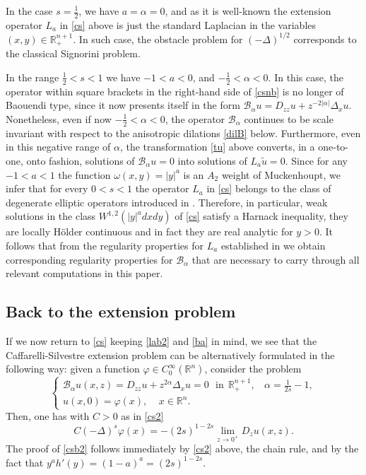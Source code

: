\documentclass[11pt]{amsart}
\theoremstyle{plain}
\numberwithin{equation}{section}
\begin{document}
In the case $s = \frac 12$, we have $a = \alpha = 0$, and as it is well-known the extension operator $L_a$ in \eqref{cs} above is just the standard Laplacian in the variables $(x,y)\in {\mathbb R}^{n+1}_+$. In such case, the obstacle problem for $(-\Delta)^{1/2}$ corresponds to the classical Signorini problem.

In the range $\frac 12 < s < 1$ we have $-1<a<0$, and $-\frac 12 < \alpha <0$. In this case, the operator within square brackets in the right-hand side of \eqref{csnb} is no longer of Baouendi type, since it now presents itself in the form ${\mathcal{B}_\alpha} u = D_{zz} u + z^{-2|\alpha|} \Delta_x u$. Nonetheless, even if now $-\frac 12 < \alpha <0$, the operator ${\mathcal{B}_\alpha}$ continues to be scale invariant with respect to the anisotropic dilations \eqref{dilB} below. Furthermore, even in this negative range of $\alpha$, the transformation \eqref{tu} above converts, in a one-to-one, onto fashion, solutions of  ${\mathcal{B}_\alpha} u = 0$ into solutions of $L_a\tilde u  = 0$.  Since for any $-1<a<1$ the function $\omega(x,y) = |y|^a$  is an $A_2$ weight of Muckenhoupt, we infer that for every $0<s<1$ the operator $L_a$ in \eqref{cs} belongs to the class of degenerate elliptic operators introduced in \cite{FKS}. Therefore, in particular, weak solutions in the class $W^{1,2}(|y|^a dx dy)$ of \eqref{cs} satisfy a Harnack inequality, they are locally H\"older continuous and in fact they are real analytic for $y>0$. It follows that from the regularity properties for $L_a$ established in \cite{CSS} we obtain corresponding regularity properties for ${\mathcal{B}_\alpha}$ that are necessary to carry through all relevant computations in this paper.

\subsection{Back to the extension problem}\label{S:bext} If we now return to \eqref{cs} keeping \eqref{lab2} and \eqref{ba} in mind, we see that the Caffarelli-Silvestre extension problem can be alternatively formulated in the following way: given a function ${\varphi}\in C^\infty_0({\mathbb R^n})$, consider the problem
\begin{equation}\label{csb}
\begin{cases}
{\mathcal{B}_\alpha} u(x,z) = D_{zz} u + z^{2\alpha} \Delta_x u = 0\ \ \ \text{in}\ \ {\mathbb R}^{n+1}_+,\ \ \ \  \alpha = \frac{1}{2s} -1,
\\
u(x,0) = {\varphi}(x),\ \ \ \ \ x\in {\mathbb R^n}.
\end{cases}
\end{equation}
Then, one has with $C >0$ as in \eqref{cs2}
\begin{equation}\label{csb2}
C (-\Delta)^s {\varphi}(x) = - (2s)^{1-2s} \underset{z\to 0^+}{\lim} D_z u(x,z).
\end{equation}
The proof of \eqref{csb2} follows immediately by \eqref{cs2} above, the chain rule, and by the fact that $y^a h'(y) = (1-a)^a = (2s)^{1-2s}$.
\end{document}
